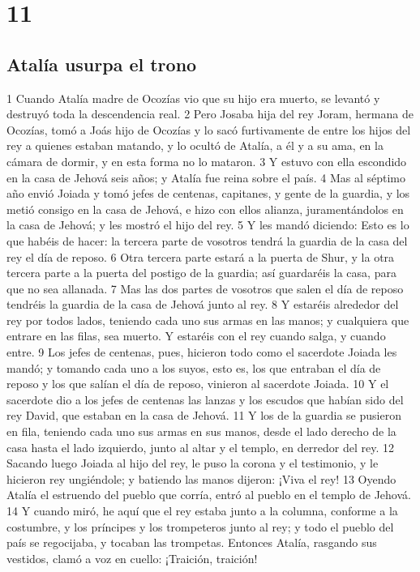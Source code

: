\chapter{11}

\section*{Atalía usurpa el trono}

 

1 Cuando Atalía madre de Ocozías vio que su hijo era muerto, se levantó y destruyó toda la descendencia real.
2 Pero Josaba hija del rey Joram, hermana de Ocozías, tomó a Joás hijo de Ocozías y lo sacó furtivamente de entre los hijos del rey a quienes estaban matando, y lo ocultó de Atalía, a él y a su ama, en la cámara de dormir, y en esta forma no lo mataron. 
3 Y estuvo con ella escondido en la casa de Jehová seis años; y Atalía fue reina sobre el país.
4 Mas al séptimo año envió Joiada y tomó jefes de centenas, capitanes, y gente de la guardia, y los metió consigo en la casa de Jehová, e hizo con ellos alianza, juramentándolos en la casa de Jehová; y les mostró el hijo del rey.
5 Y les mandó diciendo: Esto es lo que habéis de hacer: la tercera parte de vosotros tendrá la guardia de la casa del rey el día de reposo.
6 Otra tercera parte estará a la puerta de Shur, y la otra tercera parte a la puerta del postigo de la guardia; así guardaréis la casa, para que no sea allanada.
7 Mas las dos partes de vosotros que salen el día de reposo tendréis la guardia de la casa de Jehová junto al rey. 
8 Y estaréis alrededor del rey por todos lados, teniendo cada uno sus armas en las manos; y cualquiera que entrare en las filas, sea muerto. Y estaréis con el rey cuando salga, y cuando entre.
9 Los jefes de centenas, pues, hicieron todo como el sacerdote Joiada les mandó; y tomando cada uno a los suyos, esto es, los que entraban el día de reposo y los que salían el día de reposo, vinieron al sacerdote Joiada.
10 Y el sacerdote dio a los jefes de centenas las lanzas y los escudos que habían sido del rey David, que estaban en la casa de Jehová.
11 Y los de la guardia se pusieron en fila, teniendo cada uno sus armas en sus manos, desde el lado derecho de la casa hasta el lado izquierdo, junto al altar y el templo, en derredor del rey.
12 Sacando luego Joiada al hijo del rey, le puso la corona y el testimonio, y le hicieron rey ungiéndole; y batiendo las manos dijeron: ¡Viva el rey!
13 Oyendo Atalía el estruendo del pueblo que corría, entró al pueblo en el templo de Jehová.
14 Y cuando miró, he aquí que el rey estaba junto a la columna, conforme a la costumbre, y los príncipes y los trompeteros junto al rey; y todo el pueblo del país se regocijaba, y tocaban las trompetas. Entonces Atalía, rasgando sus vestidos, clamó a voz en cuello: ¡Traición, traición!

